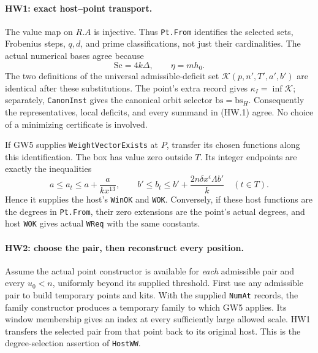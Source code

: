 \documentclass[11pt,a4paper]{article}
\numberwithin{equation}{section}
\theoremstyle{remark}\newtheorem{remark}[theorem]{Remark}
\begin{document}
\paragraph{HW1: exact host--point transport.}
The value map on $R.A$ is injective. Thus \texttt{Pt.From} identifies
the selected sets, Frobenius steps, $q,d$, and prime classifications,
not just their cardinalities. The actual numerical bases agree because
\[
 \mathrm{Sc}=4k\Delta,\qquad \eta=mh_0.             \tag{HW.2}
\]
The two definitions of the universal admissible-deficit set
$\mathcal K(p,n',T',a',b')$ are identical after these substitutions.
The point's extra record gives
$\kappa_I=\inf\mathcal K$; separately, \texttt{CanonInst} gives the
canonical orbit selector $\mathrm{bs}=\mathrm{bs}_H$.
Consequently the representatives, local deficits, and every summand in
(HW.1) agree. No choice of a minimizing certificate is involved.

If GW5 supplies \texttt{WeightVectorExists} at $P$, transfer its chosen
functions along this identification. The box has value zero outside
$T$. Its integer endpoints are exactly the inequalities
\[
 a\le a_t\le a+\frac{a}{kx^{13}},\qquad
 b'\le b_t\le b'+\frac{2n\delta x^\epsilon\Lambda b'}k
 \quad(t\in T).                                  \tag{HW.3}
\]
Hence it supplies the host's \texttt{WinOK} and \texttt{WOK}.
Conversely, if these host functions are the degrees in
\texttt{Pt.From}, their zero extensions are the point's actual degrees,
and host \texttt{WOK} gives actual \texttt{WReq} with the same constants.

\paragraph{HW2: choose the pair, then reconstruct every position.}
Assume the actual point constructor is available for \emph{each}
admissible pair and every $u_0<n$, uniformly beyond its supplied
threshold. First use any admissible pair to build temporary points and
kits. With the supplied \texttt{NumAt} records, the family constructor
produces a temporary family to which GW5 applies. Its window membership
gives an index at every sufficiently large allowed scale. HW1 transfers
the selected pair from that point back to its original host. This is the
degree-selection assertion of \texttt{HostWW}.
\end{document}
